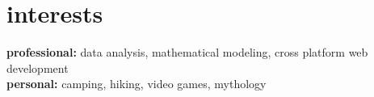 \documentclass[]{friggeri-cv} %
\begin{document}

\section{interests}

\textbf{professional:} data analysis, mathematical modeling, cross platform web development   \\
\textbf{personal:} camping, hiking, video games, mythology
\end{document}
